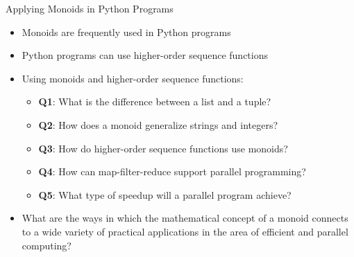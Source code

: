 \documentclass[14pt,aspectratio=169]{beamer}
\begin{document}
%
\begin{frame}{Applying Monoids in Python Programs}
  \begin{itemize}
    \item Monoids are frequently used in Python programs
      \vspace*{-.2in}
    \item Python programs can use higher-order sequence functions
      \vspace*{-.2in}
    \item Using monoids and higher-order sequence functions:
      \begin{itemize}
        \item {\bf Q1}: What is the difference between a list and a tuple?
        \item {\bf Q2}: How does a monoid generalize strings and integers?
        \item {\bf Q3}: How do higher-order sequence functions use monoids?
        \item {\bf Q4}: How can map-filter-reduce support parallel programming?
        \item {\bf Q5}: What type of speedup will a parallel program achieve?
      \end{itemize}
      \vspace*{-.2in}
    \item What are the ways in which the mathematical concept of a monoid
      connects to a wide variety of practical applications in the area of
      efficient and parallel computing?
  \end{itemize}
\end{frame}
\end{document}
